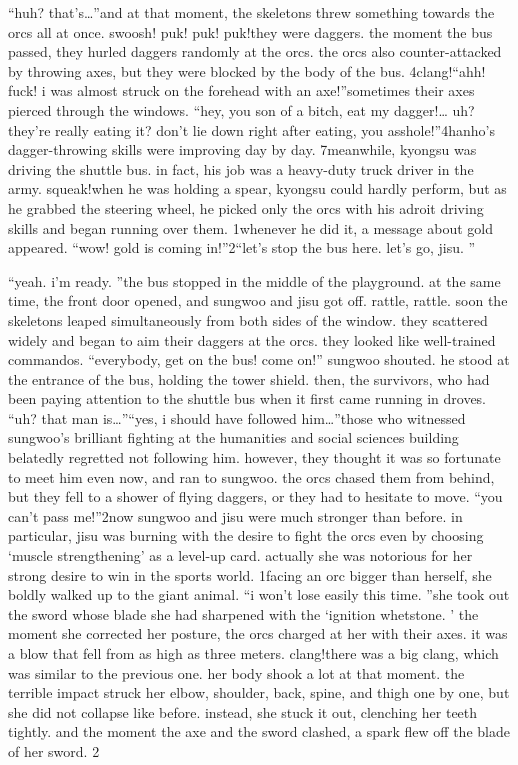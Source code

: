 “huh? that’s…”and at that moment, the skeletons threw something towards the orcs all at once.
swoosh! puk! puk! puk!they were daggers.
 the moment the bus passed, they hurled daggers randomly at the orcs.
 the orcs also counter-attacked by throwing axes, but they were blocked by the body of the bus.
4clang!“ahh! fuck! i was almost struck on the forehead with an axe!”sometimes their axes pierced through the windows.
“hey, you son of a bitch, eat my dagger!… uh? they’re really eating it? don’t lie down right after eating, you asshole!”4hanho’s dagger-throwing skills were improving day by day.
7meanwhile, kyongsu was driving the shuttle bus.
 in fact, his job was a heavy-duty truck driver in the army.
squeak!when he was holding a spear, kyongsu could hardly perform, but as he grabbed the steering wheel, he picked only the orcs with his adroit driving skills and began running over them.
1whenever he did it, a message about gold appeared.
“wow! gold is coming in!”2“let’s stop the bus here.
 let’s go, jisu.
”

“yeah.
 i’m ready.
”the bus stopped in the middle of the playground.
 at the same time, the front door opened, and sungwoo and jisu got off.
rattle, rattle.
soon the skeletons leaped simultaneously from both sides of the window.
 they scattered widely and began to aim their daggers at the orcs.
 they looked like well-trained commandos.
“everybody, get on the bus! come on!” sungwoo shouted.
 he stood at the entrance of the bus, holding the tower shield.
 then, the survivors, who had been paying attention to the shuttle bus when it first came running in droves.
“uh? that man is…”“yes, i should have followed him…”those who witnessed sungwoo’s brilliant fighting at the humanities and social sciences building belatedly regretted not following him.
 however, they thought it was so fortunate to meet him even now, and ran to sungwoo.
the orcs chased them from behind, but they fell to a shower of flying daggers, or they had to hesitate to move.
“you can’t pass me!”2now sungwoo and jisu were much stronger than before.
 in particular, jisu was burning with the desire to fight the orcs even by choosing ‘muscle strengthening’ as a level-up card.
 actually she was notorious for her strong desire to win in the sports world.
1facing an orc bigger than herself, she boldly walked up to the giant animal.
“i won’t lose easily this time.
”she took out the sword whose blade she had sharpened with the ‘ignition whetstone.
’ the moment she corrected her posture, the orcs charged at her with their axes.
 it was a blow that fell from as high as three meters.
clang!there was a big clang, which was similar to the previous one.
 her body shook a lot at that moment.
 the terrible impact struck her elbow, shoulder, back, spine, and thigh one by one, but she did not collapse like before.
 instead, she stuck it out, clenching her teeth tightly.
and the moment the axe and the sword clashed, a spark flew off the blade of her sword.
2

 
